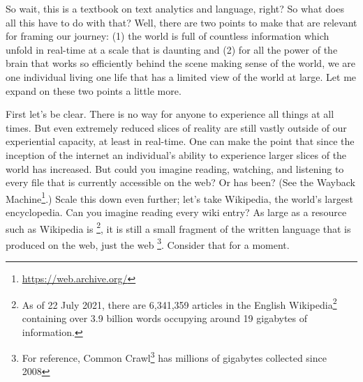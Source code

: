\documentclass[
  letterpaper,
]{scrbook}
\DeclareRobustCommand{\href}[2]{#2\footnote{\url{#1}}}
\begin{document}
So wait, this is a textbook on text analytics and language, right? So
what does all this have to do with that? Well, there are two points to
make that are relevant for framing our journey: (1) the world is full of
countless information which unfold in real-time at a scale that is
daunting and (2) for all the power of the brain that works so
efficiently behind the scene making sense of the world, we are one
individual living one life that has a limited view of the world at
large. Let me expand on these two points a little more.

First let's be clear. There is no way for anyone to experience all
things at all times. But even extremely reduced slices of reality are
still vastly outside of our experiential capacity, at least in
real-time. One can make the point that since the inception of the
internet an individual's ability to experience larger slices of the
world has increased. But could you imagine reading, watching, and
listening to every file that is currently accessible on the web? Or has
been? (See the \href{https://web.archive.org/}{Wayback Machine}.) Scale
this down even further; let's take Wikipedia, the world's largest
encyclopedia. Can you imagine reading every wiki entry? As large as a
resource such as Wikipedia is \footnote{As of 22 July 2021, there are
  6,341,359 articles in the
  \href{https://en.wikipedia.org/wiki/English_Wikipedia}{English
  Wikipedia} containing over 3.9 billion words occupying around 19
  gigabytes of information.}, it is still a small fragment of the
written language that is produced on the web, just the web \footnote{For
  reference, \href{https://commoncrawl.org/big-picture/}{Common Crawl}
  has millions of gigabytes collected since 2008}. Consider that for a
moment.
\end{document}

